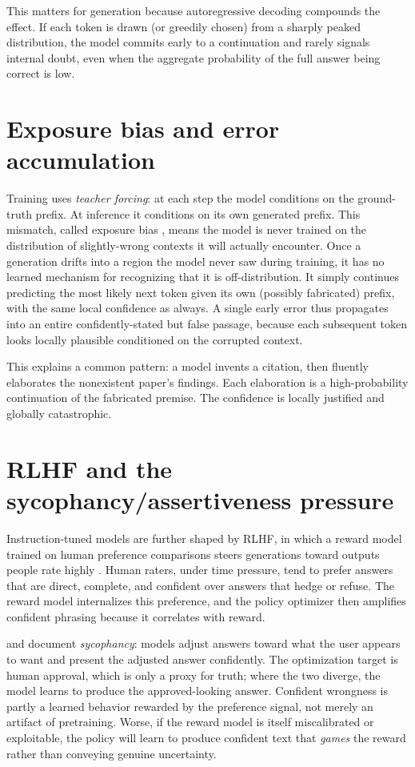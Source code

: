 \documentclass[11pt]{article}
\begin{document}
This matters for generation because autoregressive decoding compounds the effect. If each token is drawn (or greedily chosen) from a sharply peaked distribution, the model commits early to a continuation and rarely signals internal doubt, even when the aggregate probability of the full answer being correct is low.

\section{Exposure bias and error accumulation}
Training uses \emph{teacher forcing}: at each step the model conditions on the ground-truth prefix. At inference it conditions on its own generated prefix. This mismatch, called exposure bias \citep{ranzato2016sequence,bengio2015scheduled}, means the model is never trained on the distribution of slightly-wrong contexts it will actually encounter. Once a generation drifts into a region the model never saw during training, it has no learned mechanism for recognizing that it is off-distribution. It simply continues predicting the most likely next token given its own (possibly fabricated) prefix, with the same local confidence as always. A single early error thus propagates into an entire confidently-stated but false passage, because each subsequent token looks locally plausible conditioned on the corrupted context.

This explains a common pattern: a model invents a citation, then fluently elaborates the nonexistent paper's findings. Each elaboration is a high-probability continuation of the fabricated premise. The confidence is locally justified and globally catastrophic.

\section{RLHF and the sycophancy/assertiveness pressure}
Instruction-tuned models are further shaped by RLHF, in which a reward model trained on human preference comparisons steers generations toward outputs people rate highly \citep{ouyang2022training,christiano2017deep}. Human raters, under time pressure, tend to prefer answers that are direct, complete, and confident over answers that hedge or refuse. The reward model internalizes this preference, and the policy optimizer then amplifies confident phrasing because it correlates with reward. 

\citet{perez2023discovering} and \citet{sharma2024sycophancy} document \emph{sycophancy}: models adjust answers toward what the user appears to want and present the adjusted answer confidently. The optimization target is human approval, which is only a proxy for truth; where the two diverge, the model learns to produce the approved-looking answer. Confident wrongness is partly a learned behavior rewarded by the preference signal, not merely an artifact of pretraining. Worse, if the reward model is itself miscalibrated or exploitable, the policy will learn to produce confident text that \emph{games} the reward rather than conveying genuine uncertainty.
\end{document}
